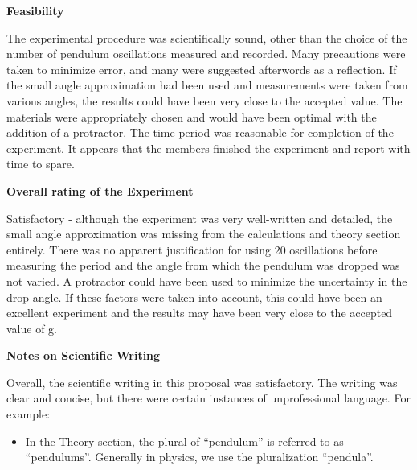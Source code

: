 \textbf{Feasibility}

The experimental procedure was scientifically sound, other than the choice of the number of pendulum oscillations measured and recorded. Many precautions were taken to minimize error, and many were suggested afterwords as a reflection. If the small angle approximation had been used and measurements were taken from various angles, the results could have been very close to the accepted value. The materials were appropriately chosen and would have been optimal with the addition of a protractor. The time period was reasonable for completion of the experiment. It appears that the members finished the experiment and report with time to spare. 

\textbf{Overall rating of the Experiment}

Satisfactory - although the experiment was very well-written and detailed, the small angle approximation was missing from the calculations and theory section entirely. There was no apparent justification for using 20 oscillations before measuring the period and the angle from which the pendulum was dropped was not varied. A protractor could have been used to minimize the uncertainty in the drop-angle. If these factors were taken into account, this could have been an excellent experiment and the results may have been very close to the accepted value of g.

\textbf{Notes on Scientific Writing}

Overall, the scientific writing in this proposal was satisfactory. The writing was clear and concise, but there were certain instances of unprofessional language. For example:
\begin{itemize}
\item In the Theory section, the plural of ``pendulum'' is referred to as ``pendulums''. Generally in physics, we use the pluralization ``pendula''. 
\end{itemize}